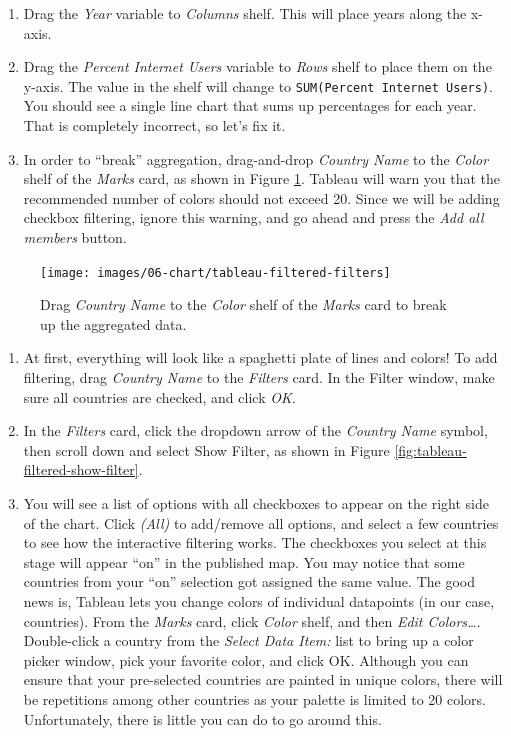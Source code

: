 \documentclass[
  english,
]{book}
\begin{document}
\begin{enumerate}
\def\labelenumi{\arabic{enumi}.}
\item
  Drag the \emph{Year} variable to \emph{Columns} shelf. This will place years along the x-axis.
\item
  Drag the \emph{Percent Internet Users} variable to \emph{Rows} shelf to place them on the y-axis. The value in the shelf will change to \texttt{SUM(Percent\ Internet\ Users)}. You should see a single line chart that sums up percentages for each year. That is completely incorrect, so let's fix it.
\item
  In order to ``break'' aggregation, drag-and-drop \emph{Country Name} to the \emph{Color} shelf of the \emph{Marks} card, as shown in Figure \ref{fig:tableau-filtered-filters}. Tableau will warn you that the recommended number of colors should not exceed 20. Since we will be adding checkbox filtering, ignore this warning, and go ahead and press the \emph{Add all members} button.
\end{enumerate}



\begin{figure}
\texttt{[image: images/06-chart/tableau-filtered-filters]} \caption{Drag \emph{Country Name} to the \emph{Color} shelf of the \emph{Marks} card to break up the aggregated data.}\label{fig:tableau-filtered-filters}
\end{figure}

\begin{enumerate}
\def\labelenumi{\arabic{enumi}.}
\setcounter{enumi}{3}
\item
  At first, everything will look like a spaghetti plate of lines and colors! To add filtering,
  drag \emph{Country Name} to the \emph{Filters} card. In the Filter window, make sure all countries
  are checked, and click \emph{OK}.
\item
  In the \emph{Filters} card, click the dropdown arrow of the \emph{Country Name} symbol, then scroll down and select Show Filter, as shown in Figure \ref{fig:tableau-filtered-show-filter}.
\item
  You will see a list of options with all checkboxes to appear on the right side of the chart.
  Click \emph{(All)} to add/remove all options, and select a few countries to see
  how the interactive filtering works. The checkboxes you select at this stage will appear ``on'' in the published map.
  You may notice that some countries from your ``on'' selection got assigned the same value. The good news is, Tableau lets you change colors of individual datapoints (in our case, countries). From the \emph{Marks} card, click \emph{Color} shelf, and then \emph{Edit Colors\ldots{}}. Double-click a country from the \emph{Select Data Item:} list to bring up a color picker window, pick your favorite color, and click OK. Although you can ensure that your pre-selected countries are painted in unique colors, there will be repetitions among other countries as your palette is limited to 20 colors. Unfortunately, there is little you can do to go around this.
\end{enumerate}
\end{document}
